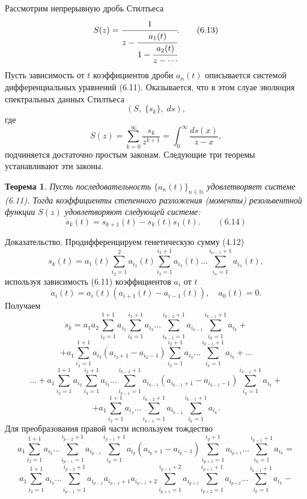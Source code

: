 \documentclass[12pt,a4paper]{article}
\theoremstyle{plain}   \newtheorem{Pro}{Задача}
\newtheorem{The}{Теорема}
\begin{document}
Рассмотрим непрерывную дробь Стилтьеса
\begin{equation*}
  S(z)=
    \cfrac{1}{z-
	  \cfrac{a_1 (t)}{1-
	    \cfrac{a_2 (t)}{z-\dotsb
	}}}.
	  \qquad (6.13)
\end{equation*}
Пусть зависимость от
$ t $
коэффициентов дроби
$ a_n (t) $
описывается системой дифференциальных уравнений (6.11).
Оказывается, что в этом слуае эволюция спектральных
данных Стилтьеса
$$
  ( S, \; \{ s_k \} , \; ds ) ,
$$
где
$$
  S(z)=\sum _{k=0}^{\infty}
    \frac{s_k}{z^{k+1}}=
	  \int _0 ^{\infty}
	    \frac{ds(x)}{z-x},
$$
подчиняется достаточно простым законам.
Следующие три теоремы устанавливают эти законы.
\begin{The}
Пусть последовательность
$ \{ a_n (t) \} _{n \in \mathbb{N}} $
удовлетворяет системе (6.11). Тогда коэффициенты степенного
разложения (моменты) резольвентной функции
$ S(z) $
удовлетворяют следующей системе:
$$
  \dot s_k (t)=s_{k+1}(t)-s_k (t)s_1 (t) .
    \qquad (6.14)
$$
\end{The}
{\Large Доказательство.}
Продифференцируем генетическую сумму (4.12)
$$
  s_k (t)=a_1 (t) \sum _{i_2 =1}^2 a_{i_2}(t)
    \sum _{i_3 =1}^{i_2 +1}a_{i_3}(t) ...
	  \sum _{i_n =1}^{i_{n-1}+1}a_{i_n}(t),
$$
используя зависимость (6.11) коэффициентов
$ a_i $
от
$ t $
$$
  \dot a_i (t)=a_i (t)(a_{i+1}(t)-a_{i-1}(t)),
    \quad a_0 (t)=0.
$$
Получаем
$$
  \dot s_k =a_1 a_2
    \sum _{i_2 =1}^{1+1}a_{i_2}
	  \sum _{i_3 =1}^{i_2 +1}a_{i_3}...
	    \sum _{i_{k-1}=1}^{i_{k-2}+1}a_{i_{k-1}}
		  \sum _{i_k =1}^{i_{k-1}+1}a_{i_k}+
$$
$$
  +a_1 \sum _{i_2 =1}^{1+1}a_{i_2}(a_{i_2 +1}-a_{i_2 -1})
    \sum _{i_3 =1}^{i_2 +1}a_{i_3}...
	  \sum _{i_k =1}^{i_{k-1}+1}a_{i_k}+...
$$
$$
  ...+a_1 \sum _{i_2 =1}^{1+1}a_{i_2}
    \sum _{i_3 =1}^{i_2 +1}a_{i_3}...
	  \sum _{i_{k-1}=1}^{i_{k-2}+1}a_{i_{k-1}}
	    (a_{i_{k-1}+1}-a_{i_{k-1}-1})
		  \sum _{i_k =1}^{i_{k-1}+1}a_{i_k}+
$$
$$
  +a_1 \sum _{i_2 =1}^{1+1}a_{i_2}...
    \sum _{i_{k-1}=1}^{i_{k-2}+1}a_{i_{k-1}}
	  \sum _{i_k =1}^{i_{k-1}+1}a_{i_k}.
$$
Для преобразования правой части используем тождество
$$
  a_1 \sum _{i_2 =1}^{1+1}a_{i_2}...
    \sum _{i_{p-1}=1}^{i_{p-2}+1}a_{i_{p-1}}
	  \sum _{i_p =1}^{i_{p-1}+1}a_{i_p}(a_{i_p +1}-a_{i_p -1})
	    \sum _{i_{p+1}=1}^{i_p +1}a_{i_{p+1}}...
		  \sum _{i_k =1}^{i_{k-1}+1}a_{i_k}=
$$
$$
  a_1 \sum _{i_2 =1}^{1+1}a_{i_2}...
    \sum _{i_{p-1}=1}^{i_{p-2}+1}a_{i_{p-1}}a_{i_{p-1}+1}a_{i_{p-1}+2}
	  \sum _{i_{p+1}=1}^{i_{p-1}+2}a_{i_{p+1}}
	    \sum _{i_{p+2}=1}^{i_{p+1}+1}a_{i_{p+2}}...
		  \sum _{i_k =1}^{i_{k-1}+1}a_{i_k}-
$$
\end{document}
